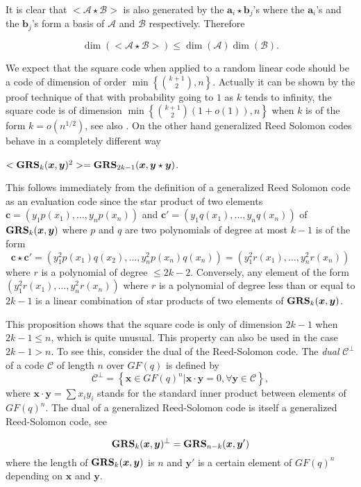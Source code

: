 \documentclass[runningheads,11pt]{llncs}
\newcommand{\code}[1]{\ensuremath{\mathscr{#1}}}
\newcommand{\scp}[2]{#1\cdot #2}
\newcommand{\word}[1]{\ensuremath{\boldsymbol{#1}}}
\newcommand{\av}{\word{a}}
\newcommand{\bv}{\word{b}}
\newcommand{\cv}{\word{c}}
\newcommand{\xv}{\word{x}}
\newcommand{\yv}{\word{y}}
\newcommand{\fq}{GF(q)}
\newcommand{\GRS}[3]{\text{\bf GRS}_{#1}(#2,#3)}
\begin{document}
It is clear that $<\code{A} \star \code{B}>$ is also generated by the $\av_i \star \bv_j$'s where the $\av_i$'s and the
$\bv_j$'s form a basis of $\code{A}$ and $\code{B}$ respectively.
Therefore
\begin{proposition}
 $$\dim(<\code{A} \star \code{B}>) \leq \dim(\code{A}) \dim(\code{B}).$$ 
\end{proposition}
We expect that the square code when applied to a random linear code should be a code of dimension of
order $\min\left\{\binom{k+1}{2},n\right\}$. Actually it can be shown by the proof technique of 
\cite{FGOPT11a}  that with probability 
going to $1$ as $k$ tends to infinity, the square  
code is of dimension $\min\left\{ \binom{k+1}{2}(1+o(1)),n\right\}$ when $k$ is of the form $k=o(n^{1/2})$, see also
\cite{MP12a}.
 On the other hand generalized Reed Solomon codes behave
in a completely different way

\begin{proposition}\label{prop:square}
$<\GRS{k}{\xv}{\yv}^2>=\GRS{2k-1}{\xv}{\yv\star\yv}$.
\end{proposition}

This follows immediately from the definition of a generalized Reed Solomon code as an evaluation code since
the star product of two elements $\cv=(y_1 p(x_1),\dots,y_np(x_n))$ and $\cv'=(y_1 q(x_1),\dots,y_nq(x_n))$ of $\GRS{k}{\xv}{\yv}$ where
$p$ and $q$ are two polynomials of degree at most $k-1$ is of the form 
$$\cv \star \cv' = (y_1^2 p(x_1)q(x_2),\dots,y_n^2 p(x_n)q(x_n))=(y_1^2r(x_1),\dots,y_n^2r(x_n))$$
where $r$ is a polynomial of degree $\leq 2k-2$. Conversely, any element of the form $(y_1^2r(x_1),\dots,y_n^2r(x_n))$
where $r$ is a polynomial of degree less than or equal to $2k-1$  is a linear combination of star products of two elements of $\GRS{k}{\xv}{\yv}$.

This proposition shows
that the square code is only of dimension $2k-1$ when $2k-1 \leq n$, which is quite unusual.
This property can also be used in the case $2k-1 >n$. To see this, consider the dual of the Reed-Solomon code.
The {\em dual} $\code{C}^\perp$ of a code $\code{C}$ of length $n$ over $\fq$ is defined by 
$$
\code{C}^\perp = \left\{\xv \in \fq^n| \scp{\xv}{\yv}=0, \forall \yv \in \code{C}\right\},
$$ 
where $\scp{\xv}{\yv}= \sum x_i y_i$ stands for the standard inner product between elements of $\fq^n$.
The dual of a generalized Reed-Solomon code is itself a generalized Reed-Solomon code, see
\cite[Theorem 4, p.304]{MacSloBook}


 \begin{proposition}\label{pr:dual}
 $$
 \GRS{k}{\xv}{\yv}^\perp = \GRS{n-k}{\xv}{\yv'} 
 $$
 where the length of $\GRS{k}{\xv}{\yv}$ is $n$ and $\yv'$ is a certain element of $\fq^n$ depending 
 on $\xv$ and $\yv$.
 \end{proposition}
\end{document}
